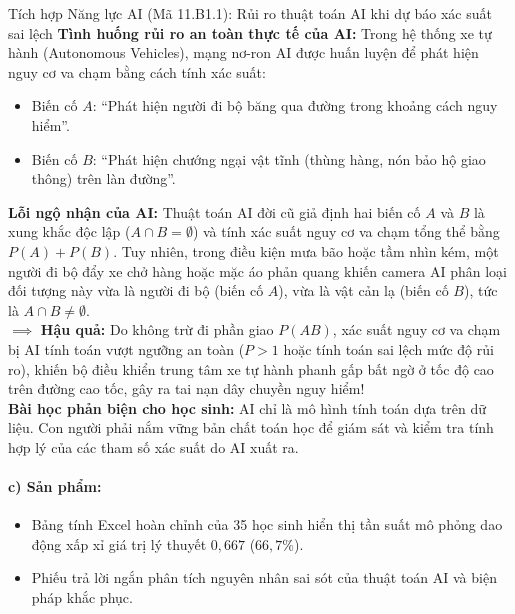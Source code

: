 \documentclass[12pt, a4paper]{article}
\begin{document}
\begin{aibox}{Tích hợp Năng lực AI (Mã 11.B1.1): Rủi ro thuật toán AI khi dự báo xác suất sai lệch}
\textbf{Tình huống rủi ro an toàn thực tế của AI:}
Trong hệ thống xe tự hành (Autonomous Vehicles), mạng nơ-ron AI được huấn luyện để phát hiện nguy cơ va chạm bằng cách tính xác suất:
\begin{itemize}[leftmargin=0.5cm]
    \item Biến cố $A$: ``Phát hiện người đi bộ băng qua đường trong khoảng cách nguy hiểm''.
    \item Biến cố $B$: ``Phát hiện chướng ngại vật tĩnh (thùng hàng, nón bảo hộ giao thông) trên làn đường''.
\end{itemize}
\textbf{Lỗi ngộ nhận của AI:} Thuật toán AI đời cũ giả định hai biến cố $A$ và $B$ là xung khắc độc lập ($A \cap B = \emptyset$) và tính xác suất nguy cơ va chạm tổng thể bằng $P(A) + P(B)$. Tuy nhiên, trong điều kiện mưa bão hoặc tầm nhìn kém, một người đi bộ đẩy xe chở hàng hoặc mặc áo phản quang khiến camera AI phân loại đối tượng này vừa là người đi bộ (biến cố $A$), vừa là vật cản lạ (biến cố $B$), tức là $A \cap B \neq \emptyset$.\\
$\implies$ \textbf{Hậu quả:} Do không trừ đi phần giao $P(AB)$, xác suất nguy cơ va chạm bị AI tính toán vượt ngưỡng an toàn ($P > 1$ hoặc tính toán sai lệch mức độ rủi ro), khiến bộ điều khiển trung tâm xe tự hành phanh gấp bất ngờ ở tốc độ cao trên đường cao tốc, gây ra tai nạn dây chuyền nguy hiểm!\\
\textbf{Bài học phản biện cho học sinh:} AI chỉ là mô hình tính toán dựa trên dữ liệu. Con người phải nắm vững bản chất toán học để giám sát và kiểm tra tính hợp lý của các tham số xác suất do AI xuất ra.
\end{aibox}

\paragraph{c) Sản phẩm:}
\begin{itemize}[leftmargin=0.8cm]
    \item Bảng tính Excel hoàn chỉnh của 35 học sinh hiển thị tần suất mô phỏng dao động xấp xỉ giá trị lý thuyết $0{,}667$ ($66{,}7\%$).
    \item Phiếu trả lời ngắn phân tích nguyên nhân sai sót của thuật toán AI và biện pháp khắc phục.
\end{itemize}
\end{document}

